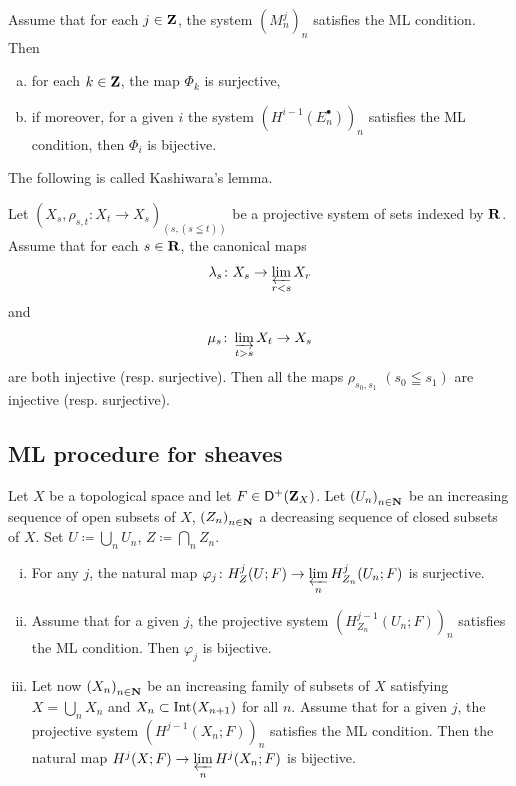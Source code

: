 \begin{Proposition+}[{\cite[Proposition 1.12.4]{KS90}}]\label{prop:ks1.12.4}
  Assume that for each \(j\in\zz\), 
  the system \(\left(M_{n}^{j}\right)_{n}\) satisfies 
  the ML condition. 
  Then
  \begin{enumerate}[(a)]
    \item for each \(k\in \zz\), the map \(\varPhi_k\) is surjective,
    \item if moreover, for a given \(i\) the system \(\left(H^{i-1}(E_{n}^{\bullet})\right)_{n}\) satisfies the ML condition, then \(\varPhi_i\) is bijective.
  \end{enumerate} 
\end{Proposition+}

The following is called Kashiwara's lemma.

\begin{Proposition+}[{\cite[Proposition 1.12.6]{KS90}}]\label{prop:ks1.12.6}
  Let \(\left(X_s,\rho_{s,t}\colon X_t\to X_s\right)_{(s,(s\leqq t))}\) be 
  a projective system of sets indexed by \(\rr\). 
  Assume that for each \(s\in\rr\), the canonical maps\[
    \lambda_s\colon X_s\to\prolim[r<s]X_r
  \] and \[
    \mu_s\colon \indlim[t>s]X_t\to X_s
  \] are both injective (resp. surjective). 
  Then all the maps \(\rho_{s_{0},s_{1}}\) \((s_0\leqq s_1)\) are 
  injective (resp. surjective).
\end{Proposition+}

\subsection*{ML procedure for sheaves}

\begin{Proposition+}[{\cite[Proposition 2.7.1]{KS90}}]\label{prop:ks2.7.1}
  Let \(X\) be a topological space and let \(F\in\Dompl(\zz_X)\). 
  Let \(\left(U_n\right)_{n\in\nn}\) be an increasing sequence 
  of open subsets of \(X\), \(\left(Z_n\right)_{n\in\nn}\) 
  a decreasing sequence of closed subsets of \(X\). 
  Set \(U\coloneqq\bigcup_{n}U_{n}\), 
  \(Z\coloneqq\bigcap_{n}Z_{n}\). 
  \begin{enumerate}[(i)]
    \item For any \(j\), the natural map \(
      \varphi_j\colon H^{j}_{Z}(U;F)
      \to 
      \prolim[n]H^{j}_{Z_{n}}(U_{n};F)
    \) is surjective. 
    \item Assume that for a given \(j\), 
    the projective system \(
      (H^{j-1}_{Z_{n}}(U_{n};F))_{n}
    \) satisfies the ML condition. 
    Then \(\varphi_{j}\) is bijective. 
    \item Let now \(\left(X_{n}\right)_{n\in\nn}\) be 
    an increasing family of subsets of \(X\) satisfying \(
      X=\bigcup_{n}X_n\) and \(X_{n}\subset \Int[](X_{n+1})
    \) for all \(n\). 
    Assume that for a given \(j\), the projective system \(
      \left(H^{j-1}(X_{n};F)\right)_{n}
    \) satisfies the ML condition. 
    Then the natural map \(
      H^{j}(X;F)\to \prolim[n]H^{j}(X_{n};F)
    \) is bijective. 
  \end{enumerate}
\end{Proposition+}

